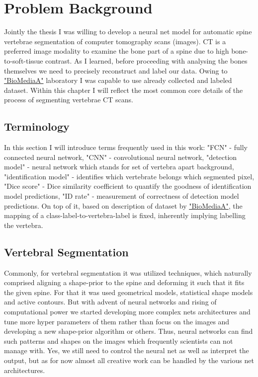 \chapter{Problem Background}
\label{ch:problem_background}
Jointly the thesis I was willing to develop a neural net model for automatic spine vertebrae segmentation of computer tomography scans (images). CT is a preferred image modality to examine the bone part of a spine due to high bone-to-soft-tissue contrast. As I learned, before proceeding with analysing the bones themselves we need to precisely reconstruct and label our data. Owing to \href{https://biomedia.doc.ic.ac.uk/}{\color{blue}"BioMediaA"} laboratory I was capable to use already collected and labeled dataset. Within this chapter I will reflect the most common core details of the process of segmenting vertebrae CT scans.            

\section{Terminology}
In this section I will introduce terms frequently used in this work: "FCN" - fully connected neural network, "CNN" - convolutional neural network, "detection model" - neural network which stands for set of vertebra apart background, "identification model" - identifies which vertebrate belongs which segmented pixel, "Dice score" - Dice similarity coefficient to quantify the goodness of identification model predictions, "ID rate" - measurement of correctness of detection model predictions. On top of it, based on description of dataset by \href{https://biomedia.doc.ic.ac.uk/}{\color{blue}"BioMediaA"}, the mapping of a class-label-to-vertebra-label is fixed, inherently implying labelling the vertebra.    

\section{Vertebral Segmentation}
Commonly, for vertebral segmentation it was utilized techniques, which naturally comprised aligning a shape-prior to the spine and deforming it such that it fits the given spine. For that it was used geometrical models,  statistical shape models and active contours. But with advent of neural networks and rising of computational power we started developing more complex nets architectures and tune more hyper parameters of them rather than focus on the images and developing a new shape-prior algorithm or others. Thus, neural networks can find such patterns and shapes on the images which frequently scientists can not manage with. Yes, we still need to control the neural net as well as interpret the output, but as for now almost all creative work can be handled by the various net architectures.

